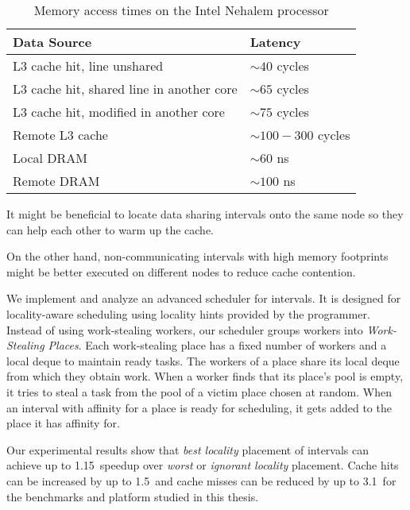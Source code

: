 \begin{table}[htb]
  \centering
  \begin{tabular}{ll}
    \toprule
    Data Source & Latency \\\midrule
    L3 cache hit, line unshared & $\sim 40$ cycles\\
    L3 cache hit, shared line in another core\hspace{0.5cm} & $\sim 65$ cycles \\
    L3 cache hit, modified in another core & $\sim 75$ cycles \\
    Remote L3 cache & $\sim 100 - 300$ cycles \\
    Local DRAM & $\sim 60$ ns \\
    Remote DRAM & $\sim 100$ ns \\\bottomrule
  \end{tabular}
  \caption[Memory access times on the Intel Nehalem processor]
  {Memory access times on the Intel Nehalem processor}
  \label{tab:locality-introduction-memory-access-times}
\end{table}

It might be beneficial to locate data sharing intervals onto the same
node so they can help each other to warm up the cache.

On the other hand, non-communicating intervals with high memory
footprints might be better executed on different nodes to reduce cache
contention.

We implement and analyze an advanced scheduler for intervals. It is
designed for locality-aware scheduling using locality hints provided
by the programmer. Instead of using work-stealing workers, our
scheduler groups workers into \emph{Work-Stealing Places}.  Each
work-stealing place has a fixed number of workers and a local deque to
maintain ready tasks. The workers of a place share its local deque
from which they obtain work. When a worker finds that its place's pool
is empty, it tries to steal a task from the pool of a victim place
chosen at random. When an interval with affinity for a place is ready
for scheduling, it gets added to the place it has affinity for.

Our experimental results show that \emph{best locality} placement of
intervals can achieve up to 1.15\texttimes\ speedup over \emph{worst}
or \emph{ignorant locality} placement. Cache hits can be increased by
up to 1.5\texttimes\ and cache misses can be reduced by up to
3.1\texttimes\ for the benchmarks and platform studied in this thesis.

